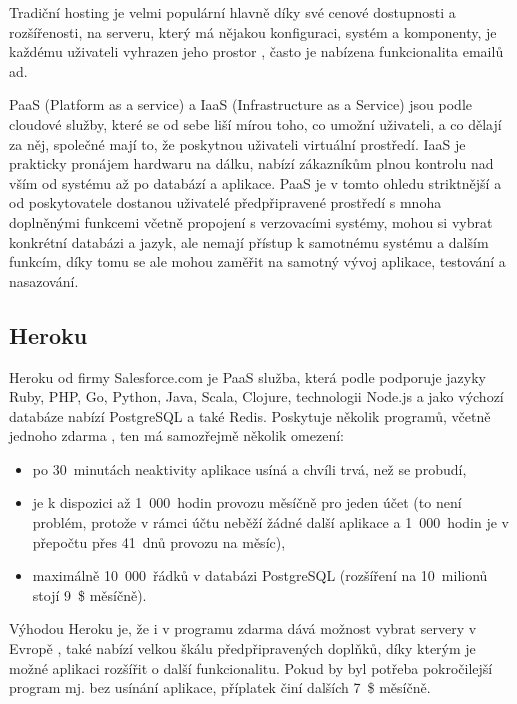     Tradiční hosting je velmi populární hlavně díky své cenové dostupnosti a rozšířenosti, na serveru, který má nějakou konfiguraci, systém a komponenty, je každému uživateli vyhrazen jeho prostor \cite{hosting2}, často je nabízena funkcionalita emailů ad.
    
    PaaS (Platform as a service) a IaaS (Infrastructure as a Service) jsou podle \cite{hosting1} cloudové služby, které se od sebe liší mírou toho, co umožní uživateli, a co dělají za něj, společné mají to, že poskytnou uživateli virtuální prostředí. IaaS je prakticky pronájem hardwaru na dálku, nabízí zákazníkům plnou kontrolu nad vším od systému až po databází a aplikace. PaaS je v tomto ohledu striktnější a od poskytovatele dostanou uživatelé předpřipravené prostředí s mnoha doplněnými funkcemi včetně propojení s verzovacími systémy, mohou si vybrat konkrétní databázi a jazyk, ale nemají přístup k samotnému systému a dalším funkcím, díky tomu se ale mohou zaměřit na samotný vývoj aplikace, testování a nasazování.
    
        \subsection{Heroku}\label{heroku}
        Heroku od firmy Salesforce.com je PaaS služba, která podle \cite{heroku1} podporuje jazyky Ruby, PHP, Go, Python, Java, Scala, Clojure, technologii Node.js a jako výchozí databáze nabízí PostgreSQL a také Redis. Poskytuje několik programů, včetně jednoho zdarma \cite{heroku2}, ten má samozřejmě několik omezení:
            \begin{itemize}
                \item po 30~minutách neaktivity aplikace usíná a chvíli trvá, než se probudí,
                \item je k dispozici až 1~000~hodin provozu měsíčně pro jeden účet (to není problém, protože v rámci účtu neběží žádné další aplikace a 1~000~hodin je v přepočtu přes 41~dnů provozu na měsíc),
                \item maximálně 10~000~řádků v databázi PostgreSQL (rozšíření na 10~milionů stojí 9~\$ měsíčně).
            \end{itemize}
        Výhodou Heroku je, že i v programu zdarma dává možnost vybrat servery v Evropě \cite{heroku3}, také nabízí velkou škálu předpřipravených doplňků, díky kterým je možné aplikaci rozšířit o další funkcionalitu. Pokud by byl potřeba pokročilejší program mj. bez usínání aplikace, příplatek činí dalších 7~\$ měsíčně.
        
